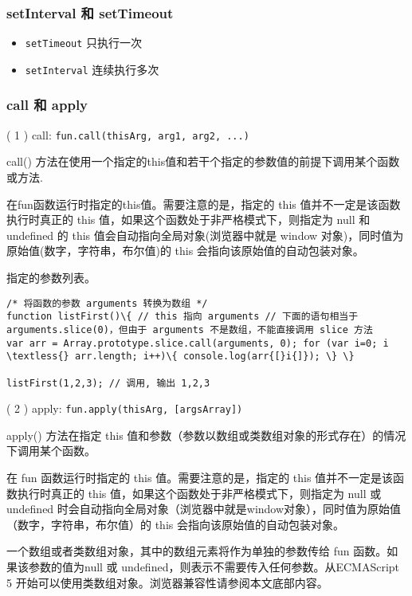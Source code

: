 \subsubsection{setInterval 和
setTimeout}\label{setinterval-ux548c-settimeout}

\begin{itemize}
\tightlist
\item
  \texttt{setTimeout} 只执行一次
\item
  \texttt{setInterval} 连续执行多次
\end{itemize}

\subsubsection{call 和 apply}\label{call-ux548c-apply}

( 1 ) call: \texttt{fun.call(thisArg,\ arg1,\ arg2,\ ...)}

call()
方法在使用一个指定的this值和若干个指定的参数值的前提下调用某个函数或方法.

\begin{description}
\tightlist
\item[thisArg]
在fun函数运行时指定的this值。需要注意的是，指定的 this
值并不一定是该函数执行时真正的 this
值，如果这个函数处于非严格模式下，则指定为 null 和 undefined 的 this
值会自动指向全局对象(浏览器中就是 window
对象)，同时值为原始值(数字，字符串，布尔值)的 this
会指向该原始值的自动包装对象。
\item[arg1, arg2, \ldots{}]
指定的参数列表。
\end{description}

\begin{verbatim}/* 将函数的参数 arguments 转换为数组 */
function listFirst()\{ // this 指向 arguments // 下面的语句相当于
arguments.slice(0)，但由于 arguments 不是数组，不能直接调用 slice 方法
var arr = Array.prototype.slice.call(arguments, 0); for (var i=0; i
\textless{} arr.length; i++)\{ console.log(arr{[}i{]}); \} \}

listFirst(1,2,3); // 调用, 输出 1,2,3 
\end{verbatim}

( 2 ) apply: \texttt{fun.apply(thisArg,\ {[}argsArray{]})}

apply() 方法在指定 this
值和参数（参数以数组或类数组对象的形式存在）的情况下调用某个函数。

\begin{description}
\tightlist
\item[thisArg]
在 fun 函数运行时指定的 this 值。需要注意的是，指定的 this
值并不一定是该函数执行时真正的 this
值，如果这个函数处于非严格模式下，则指定为 null 或 undefined
时会自动指向全局对象（浏览器中就是window对象），同时值为原始值（数字，字符串，布尔值）的
this 会指向该原始值的自动包装对象。
\item[argsArray]
一个数组或者类数组对象，其中的数组元素将作为单独的参数传给 fun
函数。如果该参数的值为null 或
undefined，则表示不需要传入任何参数。从ECMAScript 5
开始可以使用类数组对象。浏览器兼容性请参阅本文底部内容。
\end{description}

